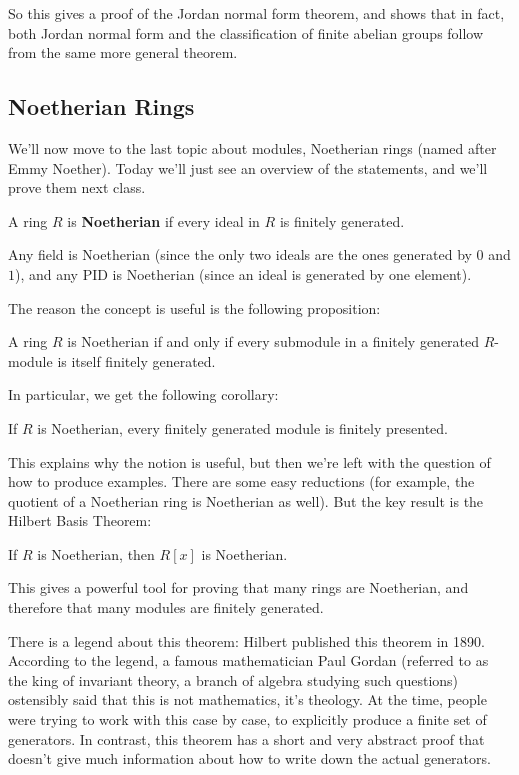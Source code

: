 So this gives a proof of the Jordan normal form theorem, and shows that in fact, both Jordan normal form and the classification of finite abelian groups follow from the same more general theorem. 

\subsection{Noetherian Rings}

We'll now move to the last topic about modules, Noetherian rings (named after Emmy Noether). Today we'll just see an overview of the statements, and we'll prove them next class. 

\begin{definition}
    A ring $R$ is \textbf{Noetherian} if every ideal in $R$ is finitely generated. 
\end{definition}

\begin{example}
    Any field is Noetherian (since the only two ideals are the ones generated by $0$ and $1$), and any PID is Noetherian (since an ideal is generated by one element). 
\end{example}

The reason the concept is useful is the following proposition:

\begin{proposition}
    A ring $R$ is Noetherian if and only if every submodule in a finitely generated $R$-module is itself finitely generated. 
\end{proposition}

In particular, we get the following corollary:

\begin{corollary}
    If $R$ is Noetherian, every finitely generated module is finitely presented. 
\end{corollary}

This explains why the notion is useful, but then we're left with the question of how to produce examples. There are some easy reductions (for example, the quotient of a Noetherian ring is Noetherian as well). But the key result is the Hilbert Basis Theorem:

\begin{theorem}
    If $R$ is Noetherian, then $R[x]$ is Noetherian. 
\end{theorem}

This gives a powerful tool for proving that many rings are Noetherian, and therefore that many modules are finitely generated. 

\begin{note}
    There is a legend about this theorem: Hilbert published this theorem in 1890. According to the legend, a famous mathematician Paul Gordan (referred to as the king of invariant theory, a branch of algebra studying such questions) ostensibly said that this is not mathematics, it's theology. At the time, people were trying to work with this case by case, to explicitly produce a finite set of generators. In contrast, this theorem has a short and very abstract proof that doesn't give much information about how to write down the actual generators. 
\end{note}

